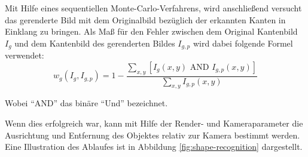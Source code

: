 Mit Hilfe eines sequentiellen Monte-Carlo-Verfahrens, wird anschließend versucht das gerenderte Bild mit dem Originalbild bezüglich der erkannten Kanten in Einklang zu bringen.
Als Maß für den Fehler zwischen dem Original Kantenbild $I_g$ und dem Kantenbild des gerenderten Bildes $I_{g,p}$ wird dabei folgende Formel verwendet:
\begin{equation}
 w_g(I_g, I_{g,p}) = 1 - \frac{\sum_{x,y} \left[ I_g(x,y) \text{ AND } I_{g,p}(x,y) \right]}{\sum_{x,y} I_{g,p}(x,y)}
\end{equation}

Wobei "`AND"' das binäre "`Und"' bezeichnet.

Wenn dies erfolgreich war, kann mit Hilfe der Render- und Kameraparameter die Ausrichtung und Entfernung des Objektes relativ zur Kamera bestimmt werden.
Eine Illustration des Ablaufes ist in Abbildung \vref{fig:shape-recognition} dargestellt.

